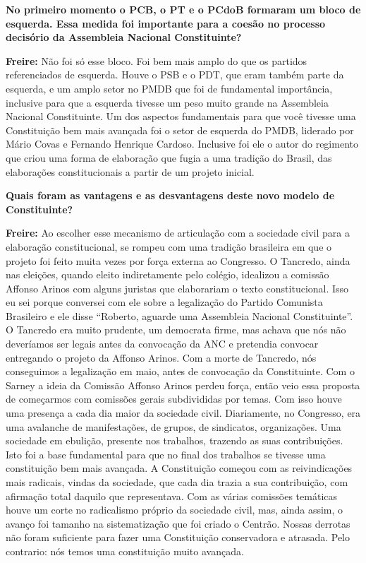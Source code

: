 \textbf{No primeiro momento o PCB, o PT e o PCdoB formaram um bloco de
esquerda. Essa medida foi importante para a coesão no processo decisório
da Assembleia Nacional Constituinte?}

\textbf{Freire:} Não foi só esse bloco. Foi bem mais amplo do que os
partidos referenciados de esquerda. Houve o PSB e o PDT, que eram também
parte da esquerda, e um amplo setor no PMDB que foi de fundamental
importância, inclusive para que a esquerda tivesse um peso muito grande
na Assembleia Nacional Constituinte. Um dos aspectos fundamentais para
que você tivesse uma Constituição bem mais avançada foi o setor de
esquerda do PMDB, liderado por Mário Covas e Fernando Henrique Cardoso.
Inclusive foi ele o autor do regimento que criou uma forma de elaboração
que fugia a uma tradição do Brasil, das elaborações constitucionais a
partir de um projeto inicial.

\textbf{Quais foram as vantagens e as desvantagens deste novo modelo de
Constituinte?}

\textbf{Freire:} Ao escolher esse mecanismo de articulação com a
sociedade civil para a elaboração constitucional, se rompeu com uma
tradição brasileira em que o projeto foi feito muita vezes por força
externa ao Congresso. O Tancredo, ainda nas eleições, quando eleito
indiretamente pelo colégio, idealizou a comissão Affonso Arinos com
alguns juristas que elaborariam o texto constitucional. Isso eu sei
porque conversei com ele sobre a legalização do Partido Comunista
Brasileiro e ele disse ``Roberto, aguarde uma Assembleia Nacional
Constituinte''. O Tancredo era muito prudente, um democrata firme, mas
achava que nós não deveríamos ser legais antes da convocação da ANC e
pretendia convocar entregando o projeto da Affonso Arinos. Com a morte
de Tancredo, nós conseguimos a legalização em maio, antes de convocação
da Constituinte. Com o Sarney a ideia da Comissão Affonso Arinos perdeu
força, então veio essa proposta de começarmos com comissões gerais
subdivididas por temas. Com isso houve uma presença a cada dia maior da
sociedade civil. Diariamente, no Congresso, era uma avalanche de
manifestações, de grupos, de sindicatos, organizações. Uma sociedade em
ebulição, presente nos trabalhos, trazendo as suas contribuições. Isto
foi a base fundamental para que no final dos trabalhos se tivesse uma
constituição bem mais avançada. A Constituição começou com as
reivindicações mais radicais, vindas da sociedade, que cada dia trazia a
sua contribuição, com afirmação total daquilo que representava. Com as
várias comissões temáticas houve um corte no radicalismo próprio da
sociedade civil, mas, ainda assim, o avanço foi tamanho na
sistematização que foi criado o Centrão. Nossas derrotas não foram
suficiente para fazer uma Constituição conservadora e atrasada. Pelo
contrario: nós temos uma constituição muito avançada.

